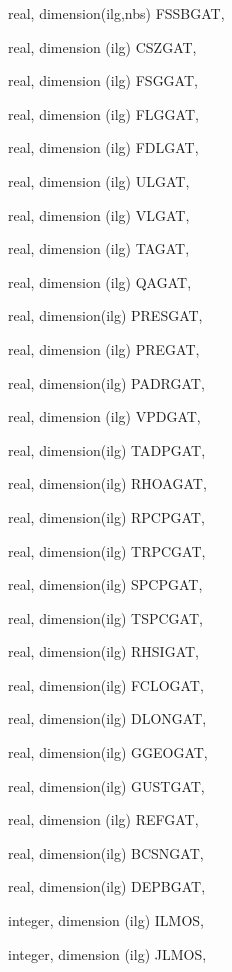 {\begin{DoxyParamCaption}
\item[{real, dimension(ilg,nbs)}]{F\+S\+S\+B\+G\+A\+T, }
\item[{real, dimension (ilg)}]{C\+S\+Z\+G\+A\+T, }
\item[{real, dimension (ilg)}]{F\+S\+G\+G\+A\+T, }
\item[{real, dimension (ilg)}]{F\+L\+G\+G\+A\+T, }
\item[{real, dimension (ilg)}]{F\+D\+L\+G\+A\+T, }
\item[{real, dimension  (ilg)}]{U\+L\+G\+A\+T, }
\item[{real, dimension  (ilg)}]{V\+L\+G\+A\+T, }
\item[{real, dimension  (ilg)}]{T\+A\+G\+A\+T, }
\item[{real, dimension  (ilg)}]{Q\+A\+G\+A\+T, }
\item[{real, dimension(ilg)}]{P\+R\+E\+S\+G\+A\+T, }
\item[{real, dimension (ilg)}]{P\+R\+E\+G\+A\+T, }
\item[{real, dimension(ilg)}]{P\+A\+D\+R\+G\+A\+T, }
\item[{real, dimension (ilg)}]{V\+P\+D\+G\+A\+T, }
\item[{real, dimension(ilg)}]{T\+A\+D\+P\+G\+A\+T, }
\item[{real, dimension(ilg)}]{R\+H\+O\+A\+G\+A\+T, }
\item[{real, dimension(ilg)}]{R\+P\+C\+P\+G\+A\+T, }
\item[{real, dimension(ilg)}]{T\+R\+P\+C\+G\+A\+T, }
\item[{real, dimension(ilg)}]{S\+P\+C\+P\+G\+A\+T, }
\item[{real, dimension(ilg)}]{T\+S\+P\+C\+G\+A\+T, }
\item[{real, dimension(ilg)}]{R\+H\+S\+I\+G\+A\+T, }
\item[{real, dimension(ilg)}]{F\+C\+L\+O\+G\+A\+T, }
\item[{real, dimension(ilg)}]{D\+L\+O\+N\+G\+A\+T, }
\item[{real, dimension(ilg)}]{G\+G\+E\+O\+G\+A\+T, }
\item[{real, dimension(ilg)}]{G\+U\+S\+T\+G\+A\+T, }
\item[{real, dimension (ilg)}]{R\+E\+F\+G\+A\+T, }
\item[{real, dimension(ilg)}]{B\+C\+S\+N\+G\+A\+T, }
\item[{real, dimension(ilg)}]{D\+E\+P\+B\+G\+A\+T, }
\item[{integer, dimension (ilg)}]{I\+L\+M\+O\+S, }
\item[{integer, dimension (ilg)}]{J\+L\+M\+O\+S, }

\end{DoxyParamCaption}}
